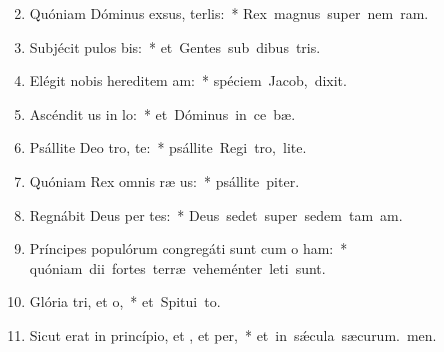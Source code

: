 \begin{flushleft}
\begin{enumerate}[leftmargin=*]
\setcounter{enumi}{1}

\item Quóniam Dóminus exsus, terlis:~* \mbox{Rex magnus super nem ram.}

\item Subjécit pulos bis:~* \mbox{et Gentes sub dibus tris.}

\item Elégit nobis hereditem am:~* \mbox{spéciem Jacob,  dixit.}

\item Ascéndit us in lo:~* \mbox{et Dóminus in ce bæ.}

\item Psállite Deo tro, te:~* \mbox{psállite Regi tro, lite.}

\item Quóniam Rex omnis ræ us:~* \mbox{psállite piter.}

\item Regnábit Deus per tes:~* \mbox{Deus sedet super sedem tam am.}

\item Príncipes populórum congregáti sunt cum o ham:~* \mbox{quóniam dii fortes terræ veheménter leti sunt.}

\item Glória tri, et o,~* \mbox{et Spitui to.}

\item Sicut erat in princípio, et , et per,~* \mbox{et in sǽcula sæcurum. men.}

\end{enumerate}
\end{flushleft}